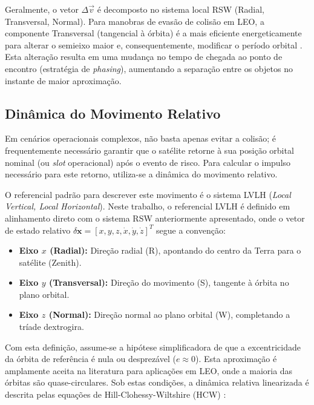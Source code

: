 Geralmente, o vetor $\Delta \vec{v}$ é decomposto no sistema local RSW (Radial, Transversal, Normal). Para manobras de evasão de colisão em LEO, a componente Transversal (tangencial à órbita) é a mais eficiente energeticamente para alterar o semieixo maior e, consequentemente, modificar o período orbital \cite{Vallado2013}. Esta alteração resulta em uma mudança no tempo de chegada ao ponto de encontro (estratégia de \textit{phasing}), aumentando a separação entre os objetos no instante de maior aproximação.

\subsection{Dinâmica do Movimento Relativo}
\label{subsec:movimento_relativo}

Em cenários operacionais complexos, não basta apenas evitar a colisão; é frequentemente necessário garantir que o satélite retorne à sua posição orbital nominal (ou \textit{slot} operacional) após o evento de risco. Para calcular o impulso necessário para este retorno, utiliza-se a dinâmica do movimento relativo.

O referencial padrão para descrever este movimento é o sistema LVLH (\textit{Local Vertical, Local Horizontal}). Neste trabalho, o referencial LVLH é definido em alinhamento direto com o sistema RSW anteriormente apresentado, onde o vetor de estado relativo $\delta \mathbf{x} = [x, y, z, \dot{x}, \dot{y}, \dot{z}]^T$ segue a convenção:

\begin{itemize}
    \item \textbf{Eixo $x$ (Radial):} Direção radial (R), apontando do centro da Terra para o satélite (Zenith).
    \item \textbf{Eixo $y$ (Transversal):} Direção do movimento (S), tangente à órbita no plano orbital.
    \item \textbf{Eixo $z$ (Normal):} Direção normal ao plano orbital (W), completando a tríade dextrogira.
\end{itemize}

Com esta definição, assume-se a hipótese simplificadora de que a excentricidade da órbita de referência é nula ou desprezável ($e \approx 0$). Esta aproximação é amplamente aceita na literatura para aplicações em LEO, onde a maioria das órbitas são quase-circulares. Sob estas condições, a dinâmica relativa linearizada é descrita pelas equações de Hill-Clohessy-Wiltshire (HCW) \cite{Clohessy1960, Vallado2013}:


